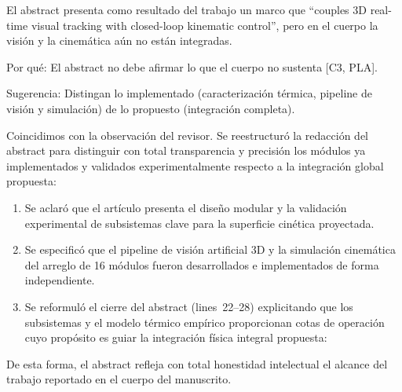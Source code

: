 \documentclass{LabDSTresponse}
\begin{document}
{El abstract presenta como resultado del trabajo un marco que “couples 3D real-time visual tracking with closed-loop kinematic control”, pero en el cuerpo la visión y la cinemática aún no están integradas.

Por qué: El abstract no debe afirmar lo que el cuerpo no sustenta [C3, PLA].

Sugerencia: Distingan lo implementado (caracterización térmica, pipeline de visión y simulación) de lo propuesto (integración completa).}
{Coincidimos con la observación del revisor. Se reestructuró la redacción del abstract para distinguir con total transparencia y precisión los módulos ya implementados y validados experimentalmente respecto a la integración global propuesta:
\begin{enumerate}
    \item Se aclaró que el artículo presenta el diseño modular y la validación experimental de subsistemas clave para la superficie cinética proyectada.
    \item Se especificó que el pipeline de visión artificial 3D y la simulación cinemática del arreglo de 16 módulos fueron desarrollados e implementados de forma independiente.
    \item Se reformuló el cierre del abstract (lines~22--28) explicitando que los subsistemas y el modelo térmico empírico proporcionan cotas de operación cuyo propósito es guiar la integración física integral propuesta:
\end{enumerate}
De esta forma, el abstract refleja con total honestidad intelectual el alcance del trabajo reportado en el cuerpo del manuscrito.}

\end{document}
